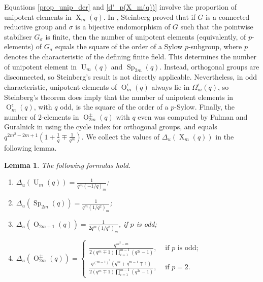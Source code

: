 \documentclass[a4paper, 12pt, oneside]{amsart}
\newtheorem{lemma}[prop]{Lemma}
\theoremstyle{definition}
\DeclareMathOperator{\U}{U}
\DeclareMathOperator{\Sp}{Sp}
\DeclareMathOperator{\Or}{O}
\DeclareMathOperator{\X}{X}
\begin{document}
Equations \eqref{prop_unip_der} and \eqref{d'_p(X_m(q))} involve the proportion of unipotent elements in $\X_m(q)$.
In \cite[Theorem~15.2]{Steinberg}, Steinberg proved that 
if $G$ is a connected reductive group and $\sigma$ is a bijective endomorphism of $G$ such that the pointwise stabiliser $G_{\sigma}$ is finite, then the number of unipotent elements (equivalently, of $p$-elements) of $G_{\sigma}$ equals the square of the order of a Sylow $p$-subgroup, where $p$ denotes the characteristic of the defining finite field. This determines the number of unipotent element in $\U_{m}(q)$ and $\Sp_{2m}(q)$. Instead, orthogonal groups are disconnected, so Steinberg's result is not directly applicable. Nevertheless, in odd characteristic, unipotent elements of $\Or^{\epsilon}_m(q)$ always lie in $\Omega^{\epsilon}_m(q)$, so Steinberg’s theorem does imply that the number of unipotent elements in $\Or^{\epsilon}_m(q)$, with $q$ odd, is the square of the order of a $p$-Sylow. Finally, the number of 2-elements in $\Or^{\pm}_{2m}(q)$ with $q$ even was computed by Fulman and Guralnick in \cite[Proposition~6.11]{FGChev} using the cycle index for orthogonal groups, and equals $q^{2m^2-2m+1}\left(1+\frac{1}{q}\mp \frac{1}{q^m}\right)$.
We collect the values of $\Delta_u(\X_m(q))$ in the following lemma.
\begin{lemma}
\label{steinberg}
The following formulas hold.
\begin{enumerate}
    \item \label{p_u}
    $\displaystyle \Delta_u(\U_m(q))=\frac{1}{q^m(-1/q)_m}$;
    \item \label{p_sp} $\displaystyle \Delta_u(\Sp_{2m}(q))=\frac{1}{q^m(1/q^2)_m}$;
    \item \label{p_o_2m1} $\displaystyle \Delta_u(\Or_{2m+1}(q))=\frac{1}{2q^m(1/q^2)_m}$, if $p$ is odd;
    \item \label{p_o2m} $\displaystyle \Delta_u(\Or^{\pm}_{2m}(q))=
    \begin{cases}
    \displaystyle\frac{q^{m^2-m}}{2(q^m \mp 1)\prod_{i=1}^{m-1}(q^{2i}-1)}, & \text{ if } p \text{ is odd};\\
    \displaystyle\frac{q^{(m-1)^2}(q^m+q^{m-1}\mp1)}{2(q^m \mp 1)\prod_{i=1}^{m-1}(q^{2i}-1)}, & \text{ if } p=2.
    \end{cases}$
\end{enumerate}
\end{lemma}
\end{document}
